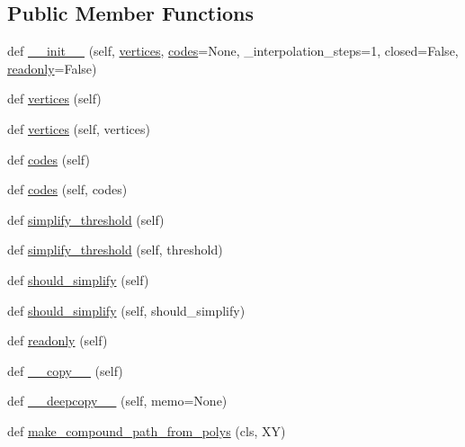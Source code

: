\subsection*{Public Member Functions}
\begin{DoxyCompactItemize}
\item 
def \hyperlink{classmatplotlib_1_1path_1_1Path_af8e0afa74a11ecee7181f3a873fa9428}{\+\_\+\+\_\+init\+\_\+\+\_\+} (self, \hyperlink{classmatplotlib_1_1path_1_1Path_a16d8c6332dee86b7ccd33eda804c5943}{vertices}, \hyperlink{classmatplotlib_1_1path_1_1Path_aee6db254a0fd529648c4c1d7d427f637}{codes}=None, \+\_\+interpolation\+\_\+steps=1, closed=False, \hyperlink{classmatplotlib_1_1path_1_1Path_aaed6949dcf8a429992d3056abf8e2bc8}{readonly}=False)
\item 
def \hyperlink{classmatplotlib_1_1path_1_1Path_a16d8c6332dee86b7ccd33eda804c5943}{vertices} (self)
\item 
def \hyperlink{classmatplotlib_1_1path_1_1Path_a9fb4403d765b7c184105742f91300db9}{vertices} (self, vertices)
\item 
def \hyperlink{classmatplotlib_1_1path_1_1Path_aee6db254a0fd529648c4c1d7d427f637}{codes} (self)
\item 
def \hyperlink{classmatplotlib_1_1path_1_1Path_ae94bddf115167ef56631291d82946e5e}{codes} (self, codes)
\item 
def \hyperlink{classmatplotlib_1_1path_1_1Path_a8cd5b4312362adf7f2cf937bdab1c177}{simplify\+\_\+threshold} (self)
\item 
def \hyperlink{classmatplotlib_1_1path_1_1Path_aaf9de7febc75199ff89ebec8a0e295d6}{simplify\+\_\+threshold} (self, threshold)
\item 
def \hyperlink{classmatplotlib_1_1path_1_1Path_ac6c55e72a1c976f2d7a5d59aea72428d}{should\+\_\+simplify} (self)
\item 
def \hyperlink{classmatplotlib_1_1path_1_1Path_a90f9d1a0e75bd36f6e2183d2897a4fab}{should\+\_\+simplify} (self, should\+\_\+simplify)
\item 
def \hyperlink{classmatplotlib_1_1path_1_1Path_aaed6949dcf8a429992d3056abf8e2bc8}{readonly} (self)
\item 
def \hyperlink{classmatplotlib_1_1path_1_1Path_a3d005b67cbba55a28f08072ef82887c7}{\+\_\+\+\_\+copy\+\_\+\+\_\+} (self)
\item 
def \hyperlink{classmatplotlib_1_1path_1_1Path_a14a6e83724ed670db368be135dffb704}{\+\_\+\+\_\+deepcopy\+\_\+\+\_\+} (self, memo=None)
\item 
def \hyperlink{classmatplotlib_1_1path_1_1Path_a082efc37cf9eaabafb4e1300fa2ed7df}{make\+\_\+compound\+\_\+path\+\_\+from\+\_\+polys} (cls, XY)

\end{DoxyCompactItemize}
